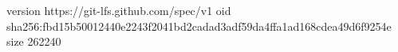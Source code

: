 version https://git-lfs.github.com/spec/v1
oid sha256:fbd15b50012440e2243f2041bd2cadad3adf59da4ffa1ad168cdea49d6f9254e
size 262240
